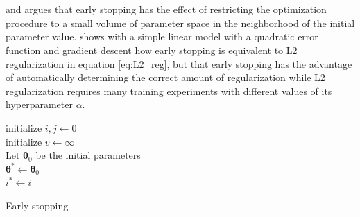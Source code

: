 \\
\\
\cite{bishop1995} and \cite{sjoberg_ljung1995} argues that early stopping has the effect of restricting the optimization procedure to a small volume of parameter space in the neighborhood of the initial parameter value. \cite{Goodfellow-et-al-2016} shows with a simple linear model with a quadratic error function and gradient descent how early stopping is equivalent to L2 regularization in equation \ref{eq:L2_reg}, but that early stopping has the advantage of automatically determining the correct amount of regularization while L2 regularization requires many training experiments with different values of its hyperparameter $\alpha$. 



\begin{algorithm}\label{alg:es}
\SetAlgoLined
{}
    initialize $i, j \leftarrow 0$ \\
    initialize $v \leftarrow \infty$\\
    Let $\boldsymbol{\theta}_0$ be the initial parameters\\
    $\boldsymbol{\theta}^* \leftarrow \boldsymbol{\theta}_0$\\
    $i^* \leftarrow i$\\
 \caption{Early stopping}
\end{algorithm}


